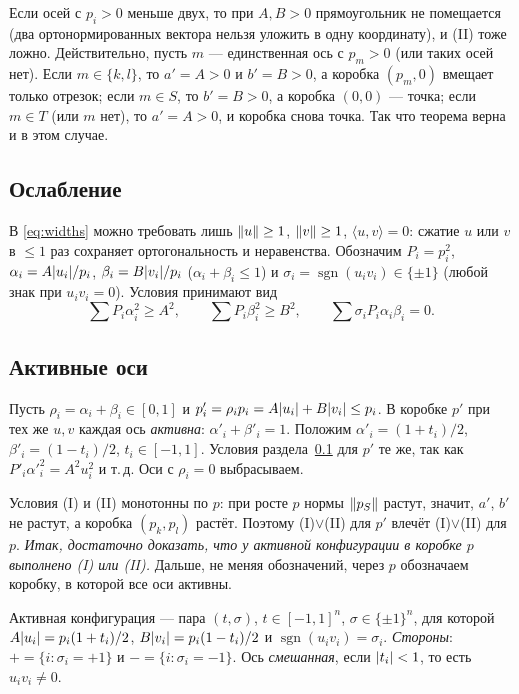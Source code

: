 \documentclass[11pt]{article}
\theoremstyle{definition}
\theoremstyle{remark}
\newcommand{\sgn}{\operatorname{sgn}}
\DeclarePairedDelimiter{\abs}{\lvert}{\rvert}
\DeclarePairedDelimiter{\norm}{\lVert}{\rVert}
\begin{document}
Если осей с $p_i>0$ меньше двух, то при $A,B>0$ прямоугольник не помещается (два ортонормированных вектора
нельзя уложить в одну координату), и (II) тоже ложно. Действительно, пусть $m$ --- единственная ось с $p_m>0$
(или таких осей нет). Если $m\in\{k,l\}$, то $a'=A>0$ и $b'=B>0$, а коробка $(p_m,0)$ вмещает только отрезок;
если $m\in S$, то $b'=B>0$, а коробка $(0,0)$ --- точка; если $m\in T$ (или $m$ нет), то $a'=A>0$, и коробка
снова точка. Так что теорема верна и в этом случае.

\subsection{Ослабление}\label{sec:relax}
В \eqref{eq:widths} можно требовать лишь $\norm u\ge1$, $\norm v\ge1$, $\langle u,v\rangle=0$: сжатие $u$
или $v$ в $\le1$ раз сохраняет ортогональность и неравенства. Обозначим $P_i=p_i^2$,
$\alpha_i=A\abs{u_i}/p_i$, $\beta_i=B\abs{v_i}/p_i$ ($\alpha_i+\beta_i\le1$) и
$\sigma_i=\sgn(u_iv_i)\in\{\pm1\}$ (любой знак при $u_iv_i=0$). Условия принимают вид
\[
\sum P_i\alpha_i^2\ge A^2,\qquad \sum P_i\beta_i^2\ge B^2,\qquad \sum\sigma_iP_i\alpha_i\beta_i=0 .
\]

\subsection{Активные оси}\label{sec:active}
Пусть $\rho_i=\alpha_i+\beta_i\in[0,1]$ и $p'_i=\rho_ip_i=A\abs{u_i}+B\abs{v_i}\le p_i$. В коробке $p'$ при
тех же $u,v$ каждая ось \emph{активна}: $\alpha'_i+\beta'_i=1$. Положим $\alpha'_i=(1+t_i)/2$,
$\beta'_i=(1-t_i)/2$, $t_i\in[-1,1]$. Условия раздела~\ref{sec:relax} для $p'$ те же, так как
$P'_i\alpha'^2_i=A^2u_i^2$ и т.\,д. Оси с $\rho_i=0$ выбрасываем.

Условия (I) и (II) монотонны по $p$: при росте $p$ нормы $\norm{p_S}$ растут, значит, $a'$, $b'$ не растут, а
коробка $(p_k,p_l)$ растёт. Поэтому (I)$\vee$(II) для $p'$ влечёт (I)$\vee$(II) для $p$.
\emph{Итак, достаточно доказать, что у активной конфигурации в коробке $p$ выполнено (I) или (II).}
Дальше, не меняя обозначений, через $p$ обозначаем коробку, в которой все оси активны.

Активная конфигурация --- пара $(t,\sigma)$, $t\in[-1,1]^n$, $\sigma\in\{\pm1\}^n$, для которой
$A\abs{u_i}=p_i(1+t_i)/2$, $B\abs{v_i}=p_i(1-t_i)/2$ и $\sgn(u_iv_i)=\sigma_i$. \emph{Стороны}:
$+=\{i:\sigma_i=+1\}$ и $-=\{i:\sigma_i=-1\}$. Ось \emph{смешанная}, если $\abs{t_i}<1$, то есть $u_iv_i\ne0$.
\end{document}
